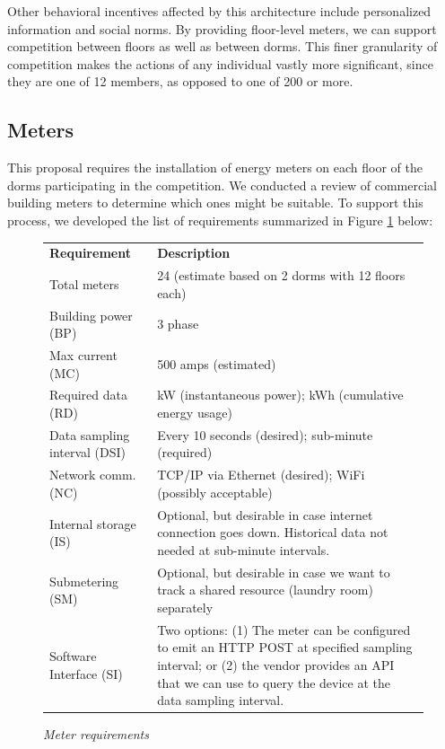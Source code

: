 \documentclass[11pt]{article}
\begin{document}
Other behavioral incentives affected by this architecture include
personalized information and social norms.  By providing floor-level
meters, we can support competition between floors as well as between dorms.
This finer granularity of competition makes the actions of any individual
vastly more significant, since they are one of 12 members, as opposed to
one of 200 or more.

\subsection{Meters}
\label{sec:meters}

This proposal requires the installation of energy meters on each floor of
the dorms participating in the competition.  We conducted a review of
commercial building meters to determine which ones might be
suitable.  To support this process, we developed the list of
requirements summarized in Figure \ref{fig:meterrequirements} below:

\begin{figure}[!ht]
\small
\begin{tabular}{p{1.75in}p{4.25in}} \hline
{\bf Requirement} & {\bf Description}  \\
Total meters & 24 (estimate based on 2 dorms with 12 floors each) \\ 
Building power (BP) & 3 phase \\  
Max current (MC) & 500 amps (estimated)  \\ 
Required data (RD) & kW (instantaneous power); kWh (cumulative energy usage) \\ 
Data sampling interval (DSI) & Every 10 seconds (desired); sub-minute (required) \\ 
Network comm. (NC) & TCP/IP via Ethernet (desired); WiFi (possibly acceptable) \\ 
Internal storage (IS) & Optional, but desirable in case internet connection
goes down. Historical data not needed at sub-minute intervals. \\ 
Submetering (SM) & Optional, but desirable in case we want to track a shared
resource (laundry room) separately \\ 
Software Interface (SI) & Two options: (1) The meter can be configured to emit
an HTTP POST at specified sampling interval; or (2) the vendor provides an
API that we can use to query the device at the data sampling interval. \\ \hline
\end{tabular} 
\normalsize
\caption{{\em Meter requirements}}
\label{fig:meterrequirements}
\end{figure}
\end{document}
